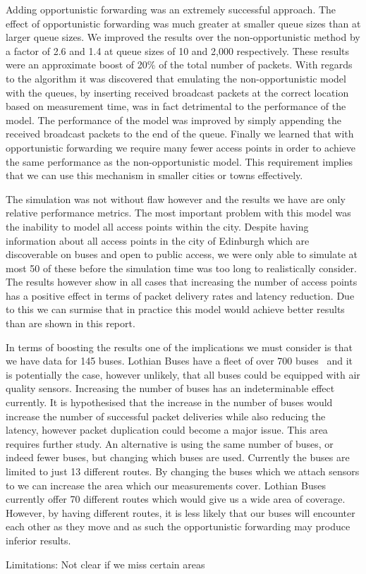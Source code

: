 Adding opportunistic forwarding was an extremely successful approach. The effect of opportunistic forwarding was much greater at smaller queue sizes than at larger queue sizes. We improved the results over the non-opportunistic method by a factor of 2.6 and 1.4 at queue sizes of 10 and 2,000 respectively. These results were an approximate boost of 20\% of the total number of packets. With regards to the algorithm it was discovered that emulating the non-opportunistic model with the queues, by inserting received broadcast packets at the correct location based on measurement time, was in fact detrimental to the performance of the model. The performance of the model was improved by simply appending the received broadcast packets to the end of the queue. Finally we learned that with opportunistic forwarding we require many fewer access points in order to achieve the same performance as the non-opportunistic model. This requirement implies that we can use this mechanism in smaller cities or towns effectively. 

The simulation was not without flaw however and the results we have are only relative performance metrics. The most important problem with this model was the inability to model all access points within the city. Despite having information about all access points in the city of Edinburgh which are discoverable on buses and open to public access, we were only able to simulate at most 50 of these before the simulation time was too long to realistically consider. The results however show in all cases that increasing the number of access points has a positive effect in terms of packet delivery rates and latency reduction. Due to this we can surmise that in practice this model would achieve better results than are shown in this report. 

In terms of boosting the results one of the implications we must consider is that we have data for 145 buses. Lothian Buses have a fleet of over 700 buses~\cite{lothianbusannualreport} and it is potentially the case, however unlikely, that all buses could be equipped with air quality sensors. Increasing the number of buses has an indeterminable effect currently. It is hypothesised that the increase in the number of buses would increase the number of successful packet deliveries while also reducing the latency, however packet duplication could become a major issue. This area requires further study. An alternative is using the same number of buses, or indeed fewer buses, but changing which buses are used. Currently the buses are limited to just 13 different routes. By changing the buses which we attach sensors to we can increase the area which our measurements cover. Lothian Buses currently offer 70 different routes which would give us a wide area of coverage. However, by having different routes, it is less likely that our buses will encounter each other as they move and as such the opportunistic forwarding may produce inferior results. 







Limitations: Not clear if we miss certain areas
